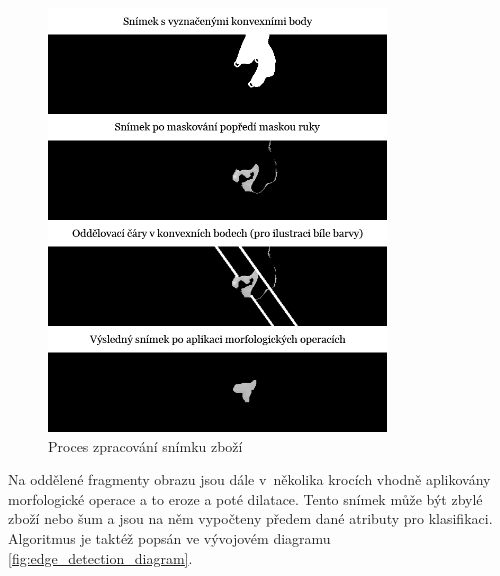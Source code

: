 \begin{figure}[h]
  \centering
  \includegraphics[width=0.8\textwidth]{images/camera_2_mog_goods_processing.png}
  \caption{Proces zpracování snímku zboží}
  \label{fig:camera_2_mog_goods_processing}
\end{figure} 

Na oddělené fragmenty obrazu jsou dále v~několika krocích vhodně aplikovány morfologické operace a to eroze a poté dilatace. Tento snímek může být zbylé zboží nebo šum a jsou na něm vypočteny předem dané atributy pro klasifikaci. Algoritmus je taktéž popsán ve vývojovém diagramu \ref{fig:edge_detection_diagram}. 

